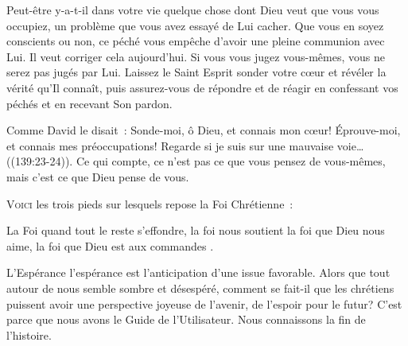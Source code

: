 
Peut-être y-a-t-il dans votre vie quelque chose dont Dieu
 veut que vous vous occupiez, un problème que vous avez essayé
 de Lui cacher.
 Que vous en soyez conscients ou non,
 ce péché vous empêche d'avoir une pleine communion avec Lui.
 Il veut corriger cela aujourd'hui.
 Si vous vous jugez vous-mêmes, vous ne serez pas jugés par Lui.
 Laissez le Saint Esprit sonder votre c\oe{}ur et révéler la vérité
 qu'Il connaît, puis assurez-vous de répondre et de réagir
 en confessant vos péchés et en recevant Son pardon.

Comme David le disait~: 
 \og Sonde-moi, ô Dieu, et connais mon c\oe{}ur!
 Éprouve-moi, et connais mes préoccupations!
 Regarde si je suis sur une mauvaise voie\dots{} \fg{}
 ((139:23-24)).
 Ce qui compte, ce n'est pas ce que vous pensez de vous-mêmes,
 mais c'est ce que Dieu pense de vous.

\dvrule







\lettrine[lhang=0.8]{V}{oici} les trois pieds sur lesquels
 repose la Foi Chrétienne~:

La Foi \ocadr quand tout le reste s'effondre, la foi nous soutient \fcadr{}
 la foi que Dieu nous aime, la foi que Dieu est \og aux commandes \fg{}.

L'Espérance \ocadr l'espérance est l'anticipation d'une issue favorable.
 Alors que tout autour de nous semble sombre et désespéré,
 comment se fait-il que les chrétiens puissent avoir une perspective
 joyeuse de l'avenir, de l'espoir pour le futur?
 C'est parce que nous avons le Guide de l'Utilisateur.
 Nous connaissons la fin de l'histoire.


